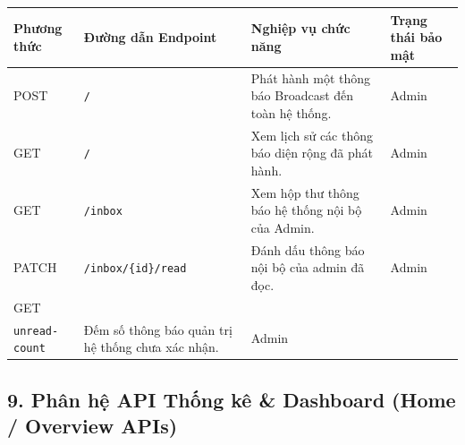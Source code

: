 \documentclass[12pt,a4paper]{article}
\makeatletter
\renewcommand{\_}{\BreakableUnderscore}
\newcommand{\tablecelllines}[1]{\begin{tabular}[t]{@{}l@{}}#1\end{tabular}}
\makeatother
\begin{document}
\begin{longtable}[]{
  |>{\raggedright\arraybackslash}p{}
  |>{\raggedright\arraybackslash}p{}
  |>{\raggedright\arraybackslash}p{}
  |>{\raggedright\arraybackslash}p{}|}
\hline\rowcolor{tableHeader}
\begin{minipage}[b]{\linewidth}\raggedright
Phương thức
\end{minipage} & \begin{minipage}[b]{\linewidth}\raggedright
Đường dẫn Endpoint
\end{minipage} & \begin{minipage}[b]{\linewidth}\raggedright
Nghiệp vụ chức năng
\end{minipage} & \begin{minipage}[b]{\linewidth}\raggedright
Trạng thái bảo mật
\end{minipage} \\
\hline
\endhead
\hline
\endlastfoot
POST & \texttt{/} & Phát hành một thông báo Broadcast đến toàn hệ thống. & Admin \\
\hline
GET & \texttt{/} & Xem lịch sử các thông báo diện rộng đã phát hành. & Admin \\
\hline
GET & \texttt{/inbox} & Xem hộp thư thông báo hệ thống nội bộ của Admin. & Admin \\
\hline
PATCH & \texttt{/inbox/\{id\}/read} & Đánh dấu thông báo nội bộ của admin đã đọc. & Admin \\
\hline
GET & \tablecelllines{\texttt{/inbox/}\\\texttt{unread-count}} & Đếm số thông báo quản trị hệ thống chưa xác nhận. & Admin \\
\hline
\end{longtable}

\subsection{9. Phân hệ API Thống kê \& Dashboard (Home / Overview APIs)}
\end{document}
